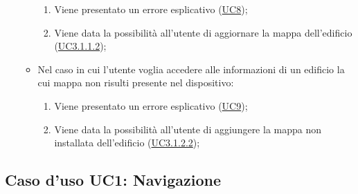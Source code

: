 \documentclass[../AnalisiDeiRequisiti.tex]{subfiles}
\begin{document}
\begin{itemize}
\begin{itemize}
\begin{enumerate}
          \item Viene presentato un errore esplicativo (\hyperlink{UC8}{UC8});
          \item Viene data la possibilità all'utente di aggiornare la mappa dell'edificio (\hyperlink{UC3.1.1.2}{UC3.1.1.2});
       \end{enumerate}
       \item Nel caso in cui l'utente voglia accedere alle informazioni di un edificio la cui mappa non risulti presente nel dispositivo: 
       \begin{enumerate}
          \item Viene presentato un errore esplicativo (\hyperlink{UC9}{UC9});
          \item Viene data la possibilità all'utente di aggiungere la mappa non installata dell'edificio (\hyperlink{UC3.1.2.2}{UC3.1.2.2});
       \end{enumerate}
      \end{itemize}
  \end{itemize}
\hypertarget{UC1}{}
\subsection{Caso d'uso UC1: Navigazione}
\end{document}
